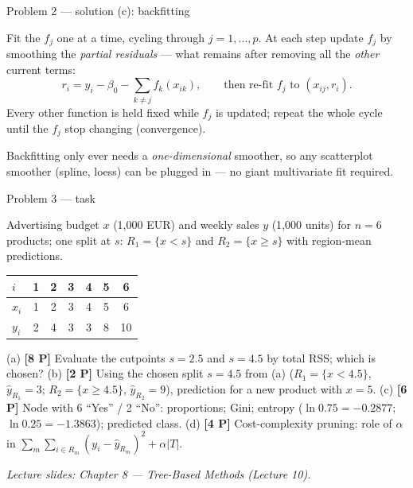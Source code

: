 \documentclass[aspectratio=169,11pt]{beamer}
\begin{document}
\begin{frame}{Problem 2 --- solution (c): backfitting}
  \begin{solutionbox}
    Fit the $f_j$ one at a time, cycling through $j=1,\dots,p$. At each step update $f_j$ by
    smoothing the \emph{partial residuals} --- what remains after removing all the \emph{other}
    current terms:
    \[
      r_i=y_i-\beta_0-\sum_{k\ne j} f_k(x_{ik}),\qquad\text{then re-fit } f_j \text{ to } (x_{ij},r_i).
    \]
    Every other function is held fixed while $f_j$ is updated; repeat the whole cycle until the
    $f_j$ stop changing (convergence).
  \end{solutionbox}
  \begin{takeaway}
    \footnotesize Backfitting only ever needs a \emph{one-dimensional} smoother, so any
    scatterplot smoother (spline, loess) can be plugged in --- no giant multivariate fit required.
  \end{takeaway}
\end{frame}

\begin{frame}{Problem 3 --- task}
  \begin{exercise}
    Advertising budget $x$ (1{,}000 EUR) and weekly sales $y$ (1{,}000 units) for $n=6$ products;
    one split at $s$: $R_1=\{x<s\}$ and $R_2=\{x\ge s\}$ with region-mean predictions.
    \begin{center}\scriptsize
    \begin{tabular}{lcccccc}
      \toprule
      $i$ & 1 & 2 & 3 & 4 & 5 & 6\\
      \midrule
      $x_i$ & 1 & 2 & 3 & 4 & 5 & 6\\
      $y_i$ & 2 & 4 & 3 & 3 & 8 & 10\\
      \bottomrule
    \end{tabular}
    \end{center}
    (a) \textbf{[8 P]} Evaluate the cutpoints $s=2.5$ and $s=4.5$ by total RSS; which is chosen?
    (b) \textbf{[2 P]} Using the chosen split $s=4.5$ from (a) ($R_1=\{x<4.5\}$, $\hat y_{R_1}=3$;
        $R_2=\{x\ge 4.5\}$, $\hat y_{R_2}=9$), prediction for a new product with $x=5$.
    (c) \textbf{[6 P]} Node with 6 ``Yes'' / 2 ``No'': proportions; Gini; entropy
        ($\ln 0.75=-0.2877$; $\ln 0.25=-1.3863$); predicted class.
    (d) \textbf{[4 P]} Cost-complexity pruning: role of $\alpha$ in
        $\sum_m\sum_{i\in R_m}(y_i-\hat y_{R_m})^2+\alpha|T|$.
  \end{exercise}
  {\scriptsize\itshape Lecture slides: Chapter 8 --- Tree-Based Methods (Lecture 10).}
\end{frame}
\end{document}
